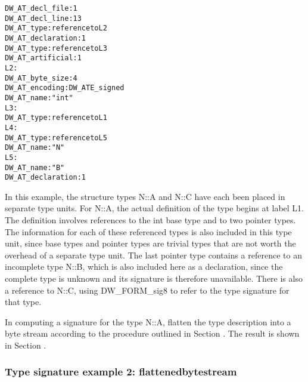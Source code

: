 \begin{alltt}
           DW\-\_AT\-\_decl\-\_file: 1
           DW\-\_AT\-\_decl\-\_line: 13
           DW\-\_AT\-\_type: reference to L2
           DW\-\_AT\-\_declaration: 1
           DW\-\_AT\-\_type: reference to L3
           DW\-\_AT\-\_artificial: 1
L2:
         DW\-\_AT\-\_byte\-\_size: 4
         DW\-\_AT\-\_encoding: DW\-\_ATE\-\_signed
         DW\-\_AT\-\_name: "int"
L3:
         DW\-\_AT\-\_type: reference to L1
L4:
         DW\-\_AT\-\_type: reference to L5
         DW\-\_AT\-\_name: "N"
L5:
           DW\-\_AT\-\_name: "B"
           DW\-\_AT\-\_declaration: 1
\end{alltt}

In this example, the structure types N::A and N::C have each
been placed in separate type units.  For N::A, the actual
definition of the type begins at label L1. The definition
involves references to the int base type and to two pointer
types. The information for each of these referenced types is
also included in this type unit, since base types and pointer
types are trivial types that are not worth the overhead of a
separate type unit. The last pointer type contains a reference
to an incomplete type N::B, which is also included here as
a declaration, since the complete type is unknown and its
signature is therefore unavailable. There is also a reference
to N::C, using DW\-\_FORM\-\_sig8 to refer to the type signature
for that type.

In computing a signature for the type N::A, flatten the type
description into a byte stream according to the procedure
outlined in 
Section .
The result is shown in 
Section .

\subsubsection{Type signature example 2: flattenedbytestream}
\label{app:typesignatureexample2flattenedbytestream}

